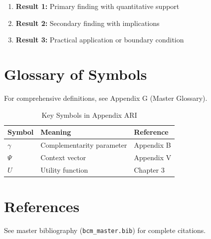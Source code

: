 \begin{enumerate}
    \item \textbf{Result 1:} Primary finding with quantitative support
    \item \textbf{Result 2:} Secondary finding with implications
    \item \textbf{Result 3:} Practical application or boundary condition
\end{enumerate}

\section{Glossary of Symbols}
\label{sec:ari-glossary}

For comprehensive definitions, see Appendix G (Master Glossary).

\begin{table}[htbp]
\centering
\caption{Key Symbols in Appendix ARI}
\begin{tabular}{lll}
\toprule
\textbf{Symbol} & \textbf{Meaning} & \textbf{Reference} \\
\midrule
$\gamma$ & Complementarity parameter & Appendix B \\
$\Psi$ & Context vector & Appendix V \\
$U$ & Utility function & Chapter 3 \\
\bottomrule
\end{tabular}
\end{table}


\section{References}
\label{sec:ari-references}

See master bibliography (\texttt{bcm\_master.bib}) for complete citations.

\nocite{bcm_master}

